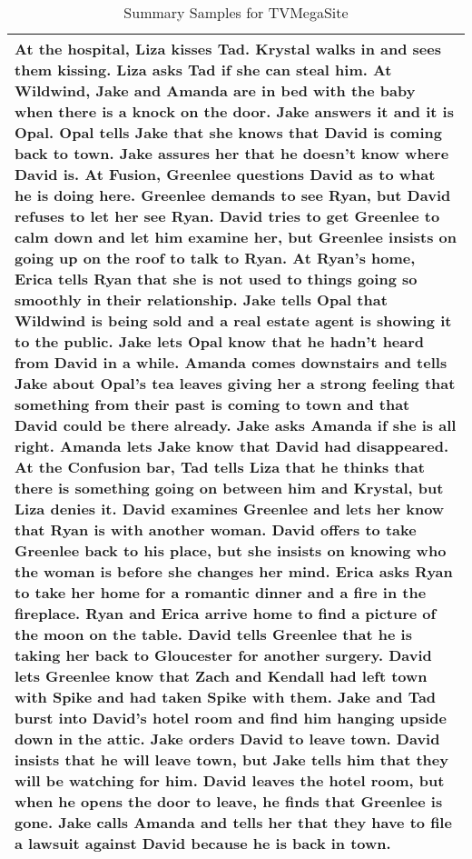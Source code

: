 \documentclass{article} \usepackage{iclr2022_conference,times}
\begin{document}
\begin{table}[!htbp]
\begin{tabular}{p{\linewidth}}
At the hospital, Liza kisses Tad. Krystal walks in and sees them kissing. Liza asks Tad if she can steal him. At Wildwind, Jake and Amanda are in bed with the baby when there is a knock on the door. Jake answers it and it is Opal. Opal tells Jake that she knows that David is coming back to town. Jake assures her that he doesn't know where David is. At Fusion, Greenlee questions David as to what he is doing here. Greenlee demands to see Ryan, but David refuses to let her see Ryan. David tries to get Greenlee to calm down and let him examine her, but Greenlee insists on going up on the roof to talk to Ryan. At Ryan's home, Erica tells Ryan that she is not used to things going so smoothly in their relationship. Jake tells Opal that Wildwind is being sold and a real estate agent is showing it to the public. Jake lets Opal know that he hadn't heard from David in a while. Amanda comes downstairs and tells Jake about Opal's tea leaves giving her a strong feeling that something from their past is coming to town and that David could be there already. Jake asks Amanda if she is all right. Amanda lets Jake know that David had disappeared. At the Confusion bar, Tad tells Liza that he thinks that there is something going on between him and Krystal, but Liza denies it. David examines Greenlee and lets her know that Ryan is with another woman. David offers to take Greenlee back to his place, but she insists on knowing who the woman is before she changes her mind. Erica asks Ryan to take her home for a romantic dinner and a fire in the fireplace. Ryan and Erica arrive home to find a picture of the moon on the table. David tells Greenlee that he is taking her back to Gloucester for another surgery. David lets Greenlee know that Zach and Kendall had left town with Spike and had taken Spike with them. Jake and Tad burst into David's hotel room and find him hanging upside down in the attic. Jake orders David to leave town. David insists that he will leave town, but Jake tells him that they will be watching for him. David leaves the hotel room, but when he opens the door to leave, he finds that Greenlee is gone. Jake calls Amanda and tells her that they have to file a lawsuit against David because he is back in town.
    \\
    \bottomrule
    \end{tabular}
    \caption{
    Summary Samples for TVMegaSite
    }
\end{table}
\end{document}
